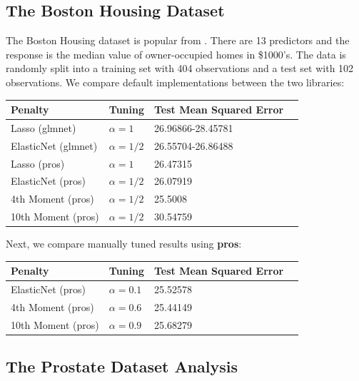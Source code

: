 \documentclass[article]{jss}
\numberwithin{equation}{section}
\begin{document}
\subsection{The Boston Housing Dataset}

The Boston Housing dataset is popular from \cite{boston_housing}.
There are 13 predictors and the response is the median value of owner-occupied homes in \$1000's. 
The data is randomly split into a training set with 404 observations and a test set with 102 observations.
We compare default implementations between the two libraries:

\begin{center}
\setlength{\tabcolsep}{20pt} %
\renewcommand{\arraystretch}{1} %
\begin{tabular}{lllp{7.4cm}}
\hline
Penalty & Tuning & Test Mean Squared Error \\ \hline
Lasso (glmnet) & $\alpha = 1$ & 26.96866-28.45781 \\
ElasticNet (glmnet) & $\alpha = 1/2$  & 26.55704-26.86488   \\
Lasso (pros) & $\alpha = 1$ &  26.47315 \\
ElasticNet (pros) & $\alpha = 1/2$ &  26.07919 \\
4th Moment (pros) & $\alpha = 1/2$ &  25.5008 \\
10th Moment (pros) & $\alpha = 1/2$ &  30.54759 \\ \hline
\end{tabular}
\end{center}

Next, we compare manually tuned results using \textbf{pros}:

\begin{center}
\setlength{\tabcolsep}{20pt} %
\renewcommand{\arraystretch}{1} %
\begin{tabular}{lllp{7.4cm}}
\hline
Penalty & Tuning & Test Mean Squared Error \\ \hline
ElasticNet (pros) & $\alpha = 0.1$ & 25.52578 \\
4th Moment (pros) & $\alpha = 0.6$ &  25.44149 \\
10th Moment (pros) & $\alpha = 0.9$ &  25.68279 \\ \hline
\end{tabular}
\end{center}

\subsection{The Prostate Dataset Analysis}
\end{document}
